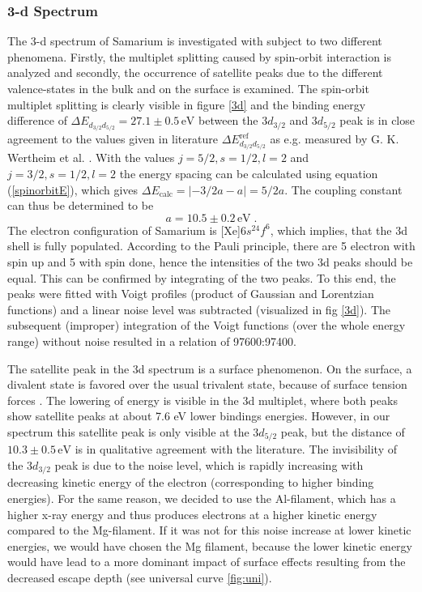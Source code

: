 \documentclass[a4paper]{scrartcl}
\numberwithin{equation}{section}
\numberwithin{figure}{section}
\numberwithin{table}{section}
\newcommand{\eq}[2]{\begin{equation}#1\label{#2}\end{equation}}
\newcommand{\Formel}[1]{(\ref{#1})}
\begin{document}
\FloatBarrier
\subsubsection{3-d Spectrum}
The 3-d spectrum of Samarium is investigated with subject to two different phenomena. Firstly, the multiplet splitting caused by spin-orbit interaction is analyzed and secondly, the occurrence of satellite peaks due to the different valence-states in the bulk and on the surface is examined. The spin-orbit multiplet splitting is clearly visible in figure \ref{3d} and the binding energy difference of $\Delta E_{d_{3/2}d_{5/2}} = 27.1 \pm 0.5 \,\text{eV}$ between the $3d_{3/2}$ and $3d_{5/2}$ peak is in close agreement to the values given in literature $\Delta E_{d_{3/2}d_{5/2}}^{\text{ref}}$ as e.g. measured by  G. K. Wertheim et al. \cite{wertheim}. With the values ${j=5/2, s=1/2, l=2}$ and ${j=3/2, s=1/2, l=2}$ the energy spacing can be calculated using equation \Formel{spinorbitE}, which gives $\Delta E_\text{calc}=\lvert-3/2 a - a \rvert=5/2 a$. The coupling constant can thus be determined to be 
\eq{a=10.5\pm 0.2\,\text{eV} \; .}{a}
The electron configuration of Samarium is [Xe]$6s^24f^6$, which implies, that the 3d shell is fully populated. According to the Pauli principle, there are 5 electron with spin up and 5 with spin done, hence the intensities of the two 3d peaks should be equal. This can be confirmed by integrating of the two peaks. To this end, the peaks were fitted with Voigt profiles (product of Gaussian and Lorentzian functions) and a linear noise level was subtracted (visualized in fig \ref{3d}). The subsequent (improper) integration of the Voigt functions (over the whole energy range) without noise resulted in a relation of 97600:97400.

The satellite peak in the 3d spectrum is a surface phenomenon. On the surface, a divalent state is favored over the usual trivalent state, because of surface tension forces  \cite{johansson}. The lowering of energy is visible in the 3d multiplet, where both peaks show satellite peaks at about 7.6 eV \cite{wertheim} lower bindings energies. However, in our spectrum this satellite peak is only visible at the $3d_{5/2}$ peak, but the distance of $10.3 \pm 0.5 \,\text{eV}$ is in qualitative agreement with the literature. The invisibility of the $3d_{3/2}$ peak is due to the noise level, which is rapidly increasing with decreasing kinetic energy of the electron (corresponding to higher binding energies). For the same reason, we decided to use the Al-filament, which has a higher x-ray energy and thus produces electrons at a higher kinetic energy compared to the Mg-filament. If it was not for this noise increase at lower kinetic energies, we would have chosen the Mg filament, because the lower kinetic energy would have lead to a more dominant impact of surface effects resulting from the decreased escape depth (see universal curve \ref{fig:uni}).
\end{document}
